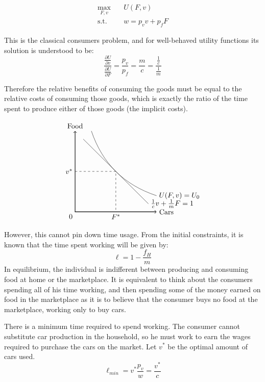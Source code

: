 \documentclass[12pt]{paper}
\begin{document}
\begin{align*}
  \max_{F,v} \quad &U( F, v)\\
  \text{s.t.} \quad& w = p_v v + p_f F
\end{align*}

This is the classical consumers problem, and for well-behaved utility
functions its solution is understood to be:
\begin{equation*}
  \frac{\frac{\partial U}{\partial v}}{\frac{\partial U}{\partial F}} = \frac{p_v}{p_f} =
  \frac{m}{c} = \frac{\frac{1}{c}}{\frac{1}{m}}
\end{equation*}

Therefore the relative benefits of consuming the goods must be equal
to the relative costs of consuming those goods, which is exactly the
ratio of the time spent to produce either of those goods (the implicit
costs).

$$\begin{tikzpicture}[scale=0.4]

\draw[thick,<->] (0,10) node[above]{Food}--(0,0)--(10,0) node[right]{Cars};

\node [below left] at (0,0) {$0$};

\node [below] at (5,0) {$F^{*}$};

\node [left] at (0,5) {$v^{*}$};

\draw(1,9)--(9,1) node[right]{$\frac{1}{c} v + \frac{1}{m} F = 1$};

\draw[dashed](0,5)--(5,5)--(5,0);

\draw(2,10) ..controls (3.33,6) and (6,3.33) .. (10,2) node[right]{$U(F,v)=U_0$};

\end{tikzpicture}$$

However, this cannot pin down time usage. From the initial
constraints, it is known that the time spent working will be given by:
\begin{equation*}
  \ell = 1 - \frac{f_H}{m}
\end{equation*}
In equilibrium, the individual is indifferent between
producing and consuming food at home or the marketplace. It is
equivalent to think about the consumers spending all of his time
working, and then spending some of the money earned on food in the
marketplace as it is to believe that the consumer buys no food at the
marketplace, working only to buy cars.

There is a minimum time required to spend working. The consumer cannot
substitute car production in the household, so he must work to earn
the wages required to purchase the cars on the market. Let $v^{*}$ be the
optimal amount of cars used.
\begin{equation*}
  \ell_{min} = v^{*} \frac{p_v}{w} = \frac{v^{*}}{c}
\end{equation*}
\end{document}

